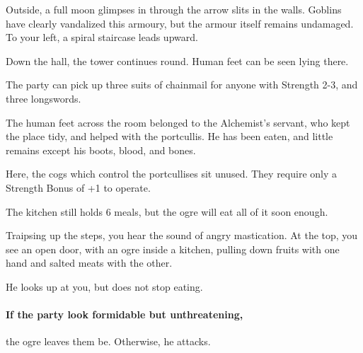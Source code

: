 \begin{multicols}{2}
\begin{boxtext}

  Outside, a full moon glimpses in through the arrow slits in the walls.
  Goblins have clearly vandalized this armoury, but the armour itself remains undamaged.
  To your left, a spiral staircase leads upward.

  Down the hall, the tower continues round.
  Human feet can be seen lying there.

\end{boxtext}


The party can pick up three suits of chainmail for anyone with Strength 2-3, and three longswords.

The human feet across the room belonged to the Alchemist's servant, who kept the place tidy, and helped with the portcullis.
He has been eaten, and little remains except his boots, blood, and bones.


Here, the cogs which control the portcullises sit unused.
They require only a Strength Bonus of +1 to operate.


The kitchen still holds 6 meals, but the ogre will eat all of it soon enough.

\begin{boxtext}

  Traipsing up the steps, you hear the sound of angry mastication.
  At the top, you see an open door, with an ogre inside a kitchen, pulling down fruits with one hand and salted meats with the other.

  He looks up at you, but does not stop eating.

\end{boxtext}

\paragraph{If the party look formidable but unthreatening,}
the ogre leaves them be.
Otherwise, he attacks.




\end{multicols}
